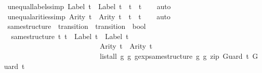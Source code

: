 \begin{isabellebody}
\isamarkupfalse%
%
\endisatagproof
{\isafoldproof}%
%
\isadelimproof
\isanewline
%
\endisadelimproof
\isanewline
{}\isamarkupfalse%
\ unequal{\isacharunderscore}labels{\isacharbrackleft}simp{\isacharbrackright}{\isacharcolon}\ {\isachardoublequoteopen}Label\ t{}\ {\isasymnoteq}\ Label\ t{}\ {\isasymLongrightarrow}\ t{}\ {\isasymnoteq}\ t{}{\isachardoublequoteclose}\isanewline
%
\isadelimproof
\ \ %
\endisadelimproof
%
\isatagproof
{}\isamarkupfalse%
\ auto%
\endisatagproof
{\isafoldproof}%
%
\isadelimproof
\isanewline
%
\endisadelimproof
\isanewline
{}\isamarkupfalse%
\ unequal{\isacharunderscore}arities{\isacharbrackleft}simp{\isacharbrackright}{\isacharcolon}\ {\isachardoublequoteopen}Arity\ t{}\ {\isasymnoteq}\ Arity\ t{}\ {\isasymLongrightarrow}\ t{}\ {\isasymnoteq}\ t{}{\isachardoublequoteclose}\isanewline
%
\isadelimproof
\ \ %
\endisadelimproof
%
\isatagproof
{}\isamarkupfalse%
\ auto%
\endisatagproof
{\isafoldproof}%
%
\isadelimproof
\isanewline
%
\endisadelimproof
\isanewline
{}\isamarkupfalse%
\ same{\isacharunderscore}structure\ {\isacharcolon}{\isacharcolon}\ {\isachardoublequoteopen}transition\ {\isasymRightarrow}\ transition\ {\isasymRightarrow}\ bool{\isachardoublequoteclose}\ \isanewline
\ \ {\isachardoublequoteopen}same{\isacharunderscore}structure\ t{}\ t{}\ {\isacharequal}\ {\isacharparenleft}Label\ t{}\ {\isacharequal}\ Label\ t{}\ {\isasymand}\isanewline
\ \ \ \ \ \ \ \ \ \ \ \ \ \ \ \ \ \ \ \ \ \ \ \ \ \ \ Arity\ t{}\ {\isacharequal}\ Arity\ t{}\ {\isasymand}\isanewline
\ \ \ \ \ \ \ \ \ \ \ \ \ \ \ \ \ \ \ \ \ \ \ \ \ \ \ list{\isacharunderscore}all\ {\isacharparenleft}{\isasymlambda}{\isacharparenleft}g{}{\isacharcomma}\ g{}{\isacharparenright}{\isachardot}\ gexp{\isacharunderscore}same{\isacharunderscore}structure\ g{}\ g{}{\isacharparenright}\ {\isacharparenleft}zip\ {\isacharparenleft}Guard\ t{}{\isacharparenright}\ {\isacharparenleft}Guard\ t{}{\isacharparenright}{\isacharparenright}{\isacharparenright}{\isachardoublequoteclose}\isanewline
%
\isadelimtheory
\isanewline
%
\endisadelimtheory
%
\isatagtheory
{}\isamarkupfalse%
%
\endisatagtheory
{\isafoldtheory}%
%
\isadelimtheory
%
\endisadelimtheory
%
\end{isabellebody}%
\endinput
